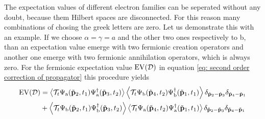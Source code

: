 The expectation values of different electron families can be seperated without any doubt, because them Hilbert spaces are disconnected.
For this reason many combinations of chosing the greek letters are zero.
Let us demonstrate this with an example.
If we choose $\alpha = \gamma = a$ and the other two ones respectively to b, than an expectation value emerge with two fermionic creation operators and another one emerge with two fermionic annihilation operators, which is always zero.
For the fermionic expectation value $\mathrm{EV}(\mathcal{D})$ in equation \eqref{eq: second order correction of propagator} this procedure yields
%
\begin{align}
	\mt{EV}(\mathcal{D}) &= 
		\expval{
			\mathcal{T}_{t}
			\Psi_{\mt{a}}(\tilde{\vb{p}}_{2},t_{1})
			\Psi_{\mt{a}}^{\dag}(\tilde{\vb{p}}_{3},t_{2})
		}
		\expval{
			\mathcal{T}_{t}
			\Psi_{\mt{b}}(\tilde{\vb{p}}_{4},t_{2})
			\Psi_{\mt{b}}^{\dag}(\tilde{\vb{p}}_{1},t_{1})
		}
		\delta_{\tilde{\vb{p}}_{2}-\tilde{\vb{p}}_{3}}
		\delta_{\tilde{\vb{p}}_{4}-\tilde{\vb{p}}_{1}}
		\notag \\
		&+
		\expval{
			\mathcal{T}_{t}
			\Psi_{\mt{b}}(\tilde{\vb{p}}_{2},t_{1})
			\Psi_{\mt{b}}^{\dag}(\tilde{\vb{p}}_{3},t_{2})
		}
		\expval{
			\mathcal{T}_{t}
			\Psi_{\mt{a}}(\tilde{\vb{p}}_{4},t_{2})
			\Psi_{\mt{a}}^{\dag}(\tilde{\vb{p}}_{1},t_{1})
		}
		\delta_{\tilde{\vb{p}}_{2}-\tilde{\vb{p}}_{3}}
		\delta_{\tilde{\vb{p}}_{4}-\tilde{\vb{p}}_{1}}
		\label{appeq: expectation value of second order correction}
\end{align}
%